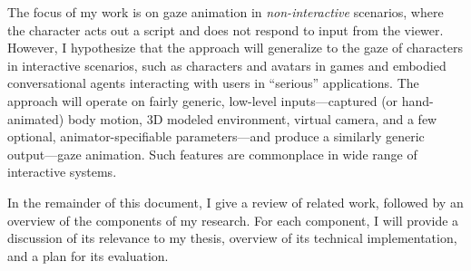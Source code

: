 The focus of my work is on gaze animation in \emph{non-interactive} scenarios, where the character acts out a script and does not respond to input from the viewer. However, I hypothesize that the approach will generalize to the gaze of characters in interactive scenarios, such as characters and avatars in games and embodied conversational agents interacting with users in ``serious'' applications. The approach will operate on fairly generic, low-level inputs---captured (or hand-animated) body motion, 3D modeled environment, virtual camera, and a few optional, animator-specifiable parameters---and produce a similarly generic output---gaze animation. Such features are commonplace in wide range of interactive systems.

In the remainder of this document, I give a review of related work, followed by an overview of the components of my research. For each component, I will provide a discussion of its relevance to my thesis, overview of its technical implementation, and a plan for its evaluation.